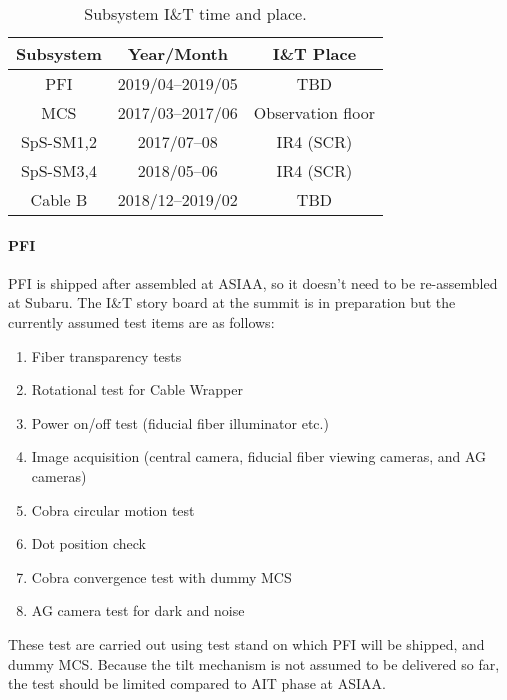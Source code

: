 \begin{table}[!ht]
\begin{center}
\caption{Subsystem I\&T time and place.}
\begin{tabular}{*{3}{c}}\label{tbl:SubSysIandT} \\ \hline
Subsystem	& Year/Month & I\&T Place \\ \hline \hline
PFI	& 2019/04--2019/05		& TBD \\
MCS	& 2017/03--2017/06	& Observation floor \\
SpS-SM1,2	& 2017/07--08		& IR4 (SCR) \\
SpS-SM3,4	& 2018/05--06		& IR4 (SCR) \\
Cable B	&	2018/12--2019/02	& TBD \\ \hline
\end{tabular} 
\end{center}
\end{table}

\paragraph{PFI}
PFI is shipped after assembled at ASIAA, so it doesn't need to be re-assembled at Subaru.
The I\&T story board at the summit is in preparation but the currently assumed test items are as follows:
\begin{enumerate}
\item Fiber transparency tests
\item Rotational test for Cable Wrapper
\item Power on/off test (fiducial fiber illuminator etc.)
\item Image acquisition (central camera, fiducial fiber viewing cameras, and AG cameras)
\item Cobra circular motion test
\item Dot position check
\item Cobra convergence test with dummy MCS
\item AG camera test for dark and noise
\end{enumerate}
These test are carried out using test stand on which PFI will be shipped, and dummy MCS.
Because the tilt mechanism is not assumed to be delivered so far, the test should be limited compared to AIT phase at ASIAA.

